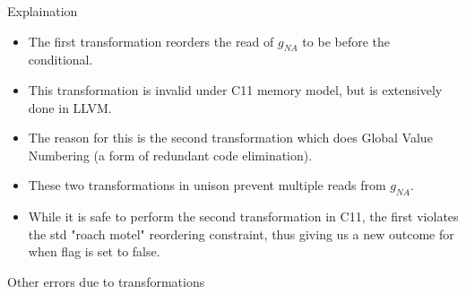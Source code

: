 \documentclass[xcolor=dvipsnames, notes]{beamer}
\begin{document}
    \begin{frame}{Explaination}

        \begin{itemize}
            \item The first transformation reorders the read of $g_{NA}$ to be before the conditional.\
            \item This transformation is invalid under C11 memory model, but is extensively done in LLVM.
            \item The reason for this is the second transformation which does Global Value Numbering (a form of redundant code elimination).
            \item These two transformations in unison prevent multiple reads from $g_{NA}$.
            \item While it is safe to perform the second transformation in C11, the first violates the std "roach motel" reordering constraint, thus giving us a new outcome for when flag is set to false.
        \end{itemize}
        

    \end{frame}

    \begin{frame}{Other errors due to transformations}

        \begin{figure}
        \end{figure}

        \begin{figure}
        \end{figure}

    \end{frame}
\end{document}
